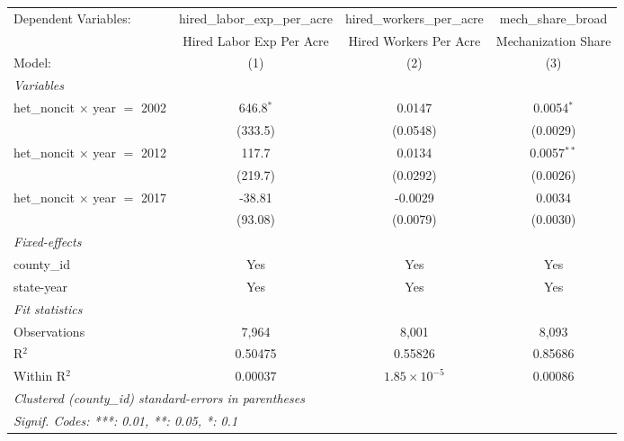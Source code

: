 
\begingroup
\centering
\begin{tabular}{lccc}
   \tabularnewline \midrule \midrule
   Dependent Variables:                 & hired\_labor\_exp\_per\_acre     & hired\_workers\_per\_acre    & mech\_share\_broad\\    
                                        & Hired Labor Exp Per Acre         & Hired Workers Per Acre       & Mechanization Share \\   
   Model:                               & (1)                              & (2)                          & (3)\\  
   \midrule
   \emph{Variables}\\
   het\_noncit $\times$ year $=$ 2002   & 646.8$^{*}$                      & 0.0147                       & 0.0054$^{*}$\\   
                                        & (333.5)                          & (0.0548)                     & (0.0029)\\   
   het\_noncit $\times$ year $=$ 2012   & 117.7                            & 0.0134                       & 0.0057$^{**}$\\   
                                        & (219.7)                          & (0.0292)                     & (0.0026)\\   
   het\_noncit $\times$ year $=$ 2017   & -38.81                           & -0.0029                      & 0.0034\\   
                                        & (93.08)                          & (0.0079)                     & (0.0030)\\   
   \midrule
   \emph{Fixed-effects}\\
   county\_id                           & Yes                              & Yes                          & Yes\\  
   state-year                           & Yes                              & Yes                          & Yes\\  
   \midrule
   \emph{Fit statistics}\\
   Observations                         & 7,964                            & 8,001                        & 8,093\\  
   R$^2$                                & 0.50475                          & 0.55826                      & 0.85686\\  
   Within R$^2$                         & 0.00037                          & $1.85\times 10^{-5}$         & 0.00086\\  
   \midrule \midrule
   \multicolumn{4}{l}{\emph{Clustered (county\_id) standard-errors in parentheses}}\\
   \multicolumn{4}{l}{\emph{Signif. Codes: ***: 0.01, **: 0.05, *: 0.1}}\\
\end{tabular}
\par\endgroup



